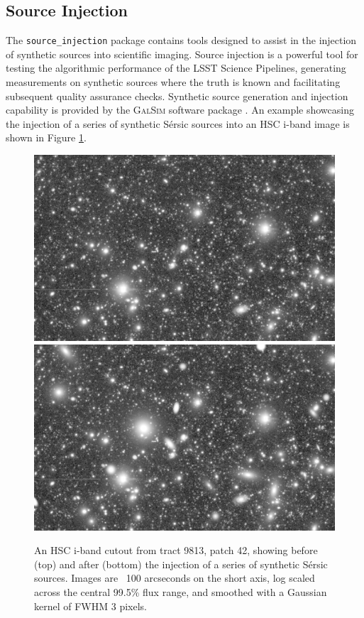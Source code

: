 \subsection{Source Injection}
\label{sec:source_injection}

The \texttt{source\_injection} package contains tools designed to assist in the injection of synthetic sources into scientific imaging.
Source injection is a powerful tool for testing the algorithmic performance of the LSST Science Pipelines, generating measurements on synthetic sources where the truth is known and facilitating subsequent quality assurance checks.
Synthetic source generation and injection capability is provided by the \textsc{GalSim} software package \citep{2015A&C....10..121R}.
An example showcasing the injection of a series of synthetic Sérsic sources into an HSC i-band image is shown in Figure \ref{fig:source_injection_example}.

\begin{figure}
    \centering
    \includegraphics[width=\linewidth]{figures/t9813p42i_zoom_sersic_pre_injection}
    \includegraphics[width=\linewidth]{figures/t9813p42i_zoom_sersic_post_injection}
    \caption{
        An HSC i-band cutout from tract 9813, patch 42, showing before (top) and after (bottom) the injection of a series of synthetic Sérsic sources.
        Images are ~100 arcseconds on the short axis, log scaled across the central 99.5\% flux range, and smoothed with a Gaussian kernel of FWHM 3 pixels.
    }
    \label{fig:source_injection_example}
\end{figure}

